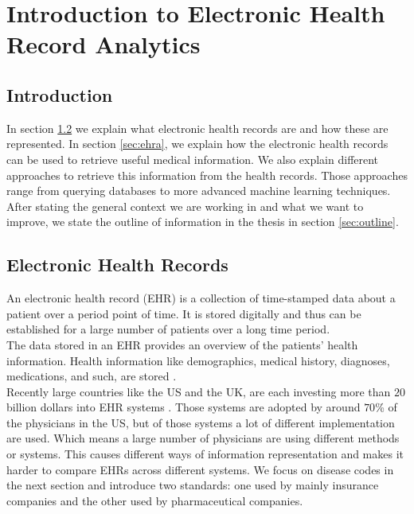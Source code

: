 \graphicspath{ {Context/Images/} }


\chapter{Introduction to Electronic Health Record Analytics}
\label{cha:context}

\section{Introduction}

In section \ref{sec:ehr} we explain what electronic health records are and how these are represented. In section \ref{sec:ehra}, we explain how the electronic health records can be used to retrieve useful medical information. We also explain different approaches to retrieve this information from the health records. Those approaches range from querying databases to more advanced machine learning techniques. After stating the general context we are working in and what we want to improve, we state the outline of information in the thesis in section \ref{sec:outline}.


\section{Electronic Health Records}
\label{sec:ehr}

An electronic health record (EHR) is a collection of time-stamped data about a patient over a period point of time. It is stored digitally and thus can be established for a large number of patients over a long time period. \\
The data stored in an EHR provides an overview of the patients' health information. Health information like demographics, medical history, diagnoses, medications, and such, are stored \cite{HealthIT:online}. \\

Recently large countries like the US and the UK, are each investing more than $20$ billion dollars into EHR systems \cite{EHRworld:article}. Those systems are adopted by around $70$\% of the physicians in the US, but of those systems a lot of different implementation are used. Which means a large number of physicians are using different methods or systems. This causes different ways of information representation and makes it harder to compare EHRs across different systems. We focus on disease codes in the next section and introduce two standards: one used by mainly insurance companies and the other used by pharmaceutical companies. 


